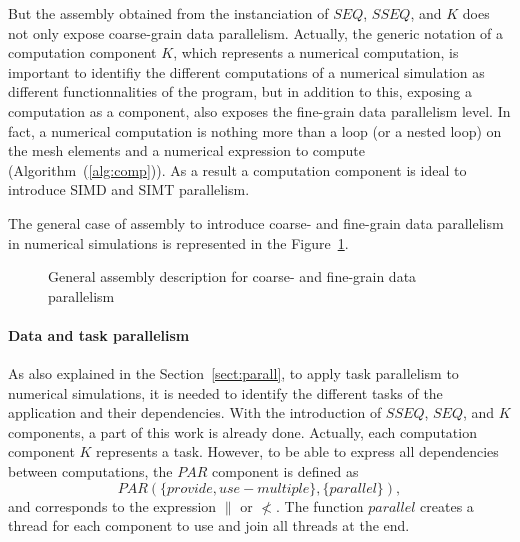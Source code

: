 But the assembly obtained from the instanciation of $SEQ$, $SSEQ$, and $K$ does not only expose coarse-grain data parallelism. Actually, the generic notation of a computation component $K$, which represents a numerical computation, is important to identifiy the different computations of a numerical simulation as different functionnalities of the program, but in addition to this, exposing a computation as a component, also exposes the fine-grain data parallelism level. In fact, a numerical computation is nothing more than a loop (or a nested loop) on the mesh elements and a numerical expression to compute (Algorithm~(\ref{alg:comp})). As a result a computation component is ideal to introduce SIMD and SIMT parallelism.

The general case of assembly to introduce coarse- and fine-grain data parallelism in numerical simulations is represented in the Figure~\ref{dataparall}.

\begin{figure}[h!]
\begin{center}
\caption{General assembly description for coarse- and fine-grain data parallelism}
\label{dataparall}
\end{center}
\end{figure}

\paragraph{Data and task parallelism}
As also explained in the Section~\ref{sect:parall}, to apply task parallelism to numerical simulations, it is needed to identify the different tasks of the application and their dependencies. With the introduction of $SSEQ$, $SEQ$, and $K$ components, a part of this work is already done. Actually, each computation component $K$ represents a task. However, to be able to express all dependencies between computations, the $PAR$ component is defined as 
\begin{equation}
PAR(\{provide,use-multiple\},\{parallel\}),
\end{equation}
 and corresponds to the expression $\parallel$ or $\not<$. The function $parallel$ creates a thread for each component to use and join all threads at the end.


